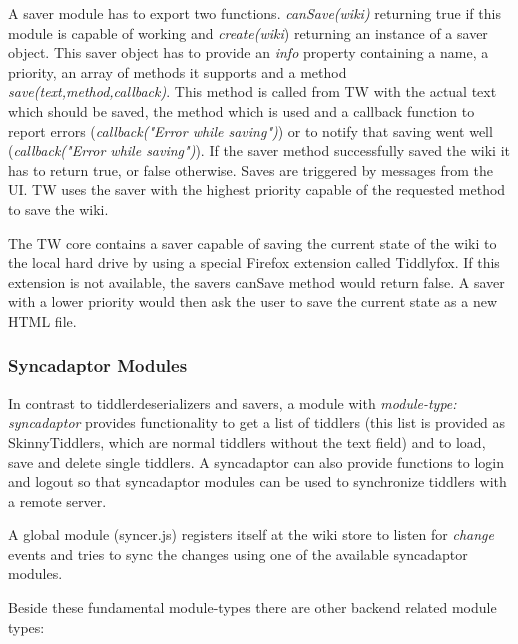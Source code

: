 \documentclass[12pt,a4paper]{scrartcl}
\begin{document}
A saver module has to export two functions. \textit{canSave(wiki)} returning true if this module is capable of working and \textit{create(wiki}) returning an instance of a saver object.
This saver object has to provide an \textit{info} property containing a name, a priority, an array of methods it supports
and a method \textit{save(text,method,callback)}. This method is called from TW with the actual text which should be saved, the method which is used and a callback function to report errors (\textit{callback("Error while saving")}) or to notify that saving went well (\textit{callback("Error while saving")}). If the saver method successfully saved the wiki it has to return true, or false otherwise.
Saves are triggered by messages from the UI. TW uses the saver with the highest priority capable of the requested method to save the wiki.

The TW core contains a saver capable of saving the current state of the wiki to the local hard drive by using a special Firefox extension called Tiddlyfox. If this extension is not available, the savers canSave method would return false. A saver with a lower priority would then ask the user to save the current state as a new HTML file.

\subsubsection*{Syncadaptor Modules}

In contrast to tiddlerdeserializers and savers, a module with \textit{module-type: syncadaptor} provides functionality to get a list of tiddlers (this list is provided as SkinnyTiddlers, which are normal tiddlers without the text field) and to load, save and delete single tiddlers. A syncadaptor can also provide functions to login and logout so that syncadaptor modules can be used to synchronize tiddlers with a remote server.

A global module (syncer.js) registers itself at the wiki store to listen for \textit{change} events and tries to sync the changes using one of the available syncadaptor modules.

Beside these fundamental module-types there are other backend related module types:
\end{document}
